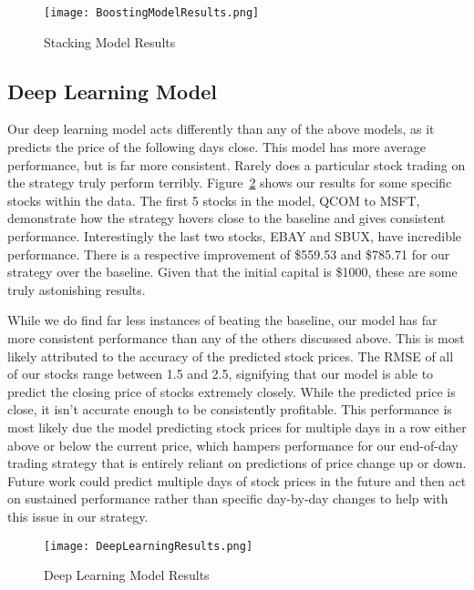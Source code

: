 \documentclass[../thesis.tex]{subfiles}
\begin{document}
\begin{figure}[h]
\centering
\texttt{[image: BoostingModelResults.png]}
\caption{Stacking Model Results \label{overflow}}
\label{stackingresults}
\end{figure}

\subsection{Deep Learning Model}
Our deep learning model acts differently than any of the above models, as it predicts the price of the following days close. This model has more average performance, but is far more consistent. Rarely does a particular stock trading on the strategy truly perform terribly. Figure~\ref{deepresults} shows our results for some specific stocks within the data. The first 5 stocks in the model, QCOM to MSFT, demonstrate how the strategy hovers close to the baseline and gives consistent performance. Interestingly the last two stocks, EBAY and SBUX, have incredible performance. There is a respective improvement of \$559.53 and \$785.71 for our strategy over the baseline. Given that the initial capital is \$1000, these are some truly astonishing results. 


While we do find far less instances of beating the baseline, our model has far more consistent performance than any of the others discussed above. This is most likely attributed to the accuracy of the predicted stock prices. The RMSE of all of our stocks range between 1.5 and 2.5, signifying that our model is able to predict the closing price of stocks extremely closely. While the predicted price is close, it isn't accurate enough to be consistently profitable. This performance is most likely due the model predicting stock prices for multiple days in a row either above or below the current price, which hampers performance for our end-of-day trading strategy that is entirely reliant on  predictions of price change up or down. Future work could predict multiple days of stock prices in the future and then act on sustained performance rather than specific day-by-day changes to help with this issue in our strategy. 

\begin{figure}[h]
\centering
\texttt{[image: DeepLearningResults.png]}
\caption{Deep Learning Model Results \label{overflow}}
\label{deepresults}
\end{figure}
\end{document}
